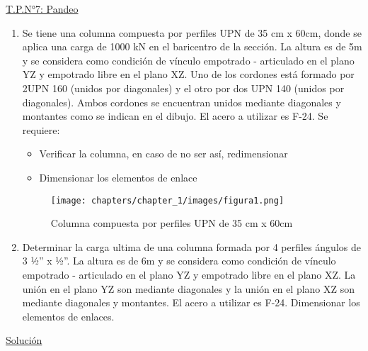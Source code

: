 \begin{center}
\underline{\Large{T.P.N°7: Pandeo}}
\end{center}

\begin{enumerate}
\item Se tiene una columna compuesta por perfiles UPN de 35 cm x 60cm, donde se aplica
una carga de 1000 kN en el baricentro de la sección. La altura es de 5m y se
considera como condición de vínculo empotrado - articulado en el plano YZ y
empotrado libre en el plano XZ. Uno de los cordones está formado por 2UPN 160
(unidos por diagonales) y el otro por dos UPN 140 (unidos por diagonales). Ambos
cordones se encuentran unidos mediante diagonales y montantes como se indican en
el dibujo. El acero a utilizar es F-24. Se requiere:
\begin{itemize}
\item Verificar la columna, en caso de no ser así, redimensionar
\item Dimensionar los elementos de enlace
\end{itemize}

\begin{figure}[H]
\begin{center}
     \texttt{[image: chapters/chapter\_1/images/figura1.png]}
\end{center}
\caption{Columna compuesta por perfiles UPN de 35 cm x 60cm}
\end{figure}
\item Determinar la carga ultima de una columna formada por 4 perfiles ángulos de 3 ½” x
½”. La altura es de 6m y se considera como condición de vínculo empotrado -
articulado en el plano YZ y empotrado libre en el plano XZ. La unión en el plano
YZ son mediante diagonales y la unión en el plano XZ son mediante diagonales y
montantes. El acero a utilizar es F-24. Dimensionar los elementos de enlaces.

\end{enumerate}

\newpage

\begin{center}
\underline{\Large{Solución}}
\end{center}

